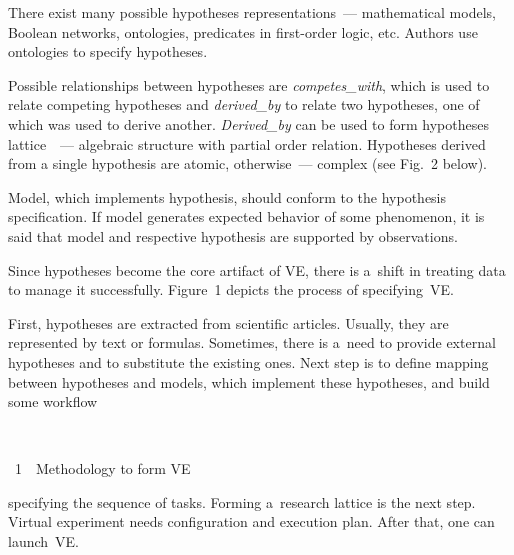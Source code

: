 \begin{multicols}{2}
      There exist many possible hypotheses representations~--- mathematical models, 
Boolean networks, ontologies, predicates in first-order logic, etc. Authors use 
ontologies to specify hypotheses.
      
      Possible relationships between hypotheses are \textit{competes\_with}, which 
is used to relate competing hypotheses and \textit{derived\_by} to relate two 
hypotheses, one of which was used to derive another. \textit{Derived\_by} can be 
used to form hypotheses lattice~\cite{17-tar}~--- algebraic structure with partial 
order relation. Hypotheses derived from a single hypothesis are atomic, otherwise~--- 
complex (see Fig.~2 below).
      
      Model, which implements hypothesis, should conform to the hypothesis 
specification. If model generates expected behavior of some phenomenon, it is said 
that model and respective hypothesis are supported by observations.
      
      Since hypotheses become the core artifact of VE, there is 
a~shift in treating data to manage it successfully. Figure~1 depicts the process of 
specifying~VE.

First, hypotheses are extracted from scientific articles. Usually, they are 
represented by text or formulas. Sometimes, there is a~need to provide external 
hypotheses and to substitute the existing ones. Next step is to define mapping between 
hypotheses and models, which implement these hypotheses, and build some 
workflow\linebreak\vspace*{-12pt}

{ \begin{center}  %
 \vspace*{9pt}
  \mbox{%
 \epsfxsize=78.4mm 
 }


\vspace*{6pt}


\noindent
{{\figurename~1}\ \ \small{Methodology to form VE}}
\end{center}
}


\addtocounter{figure}{1}



      
      
      \noindent
       specifying the sequence of tasks. Forming a~research lattice is the next step. 
Virtual experiment needs configuration and execution plan. After that, one can
 launch~VE.
      

\end{multicols}
